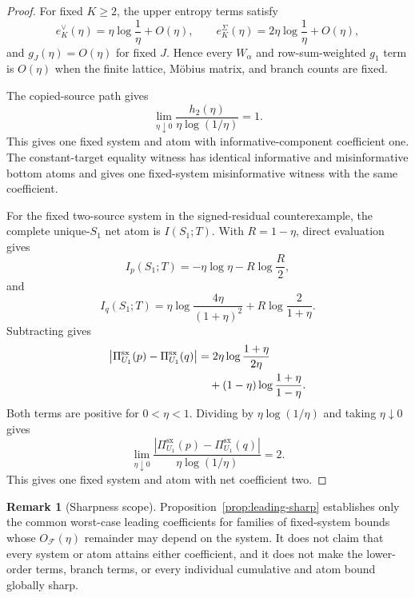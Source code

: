 \documentclass[11pt]{article}
\theoremstyle{definition}
\newtheorem{remark}[theorem]{Remark}
\newcommand{\sx}{\mathrm{sx}}
\begin{document}
\begin{proof}
For fixed \(K\geq2\), the upper entropy terms satisfy
\begin{equation}
  e_K^\vee(\eta)
  =
  \eta\log\frac1\eta+O(\eta),
  \qquad
  e_K^\Sigma(\eta)
  =
  2\eta\log\frac1\eta+O(\eta),
\end{equation}
and \(g_J(\eta)=O(\eta)\) for fixed \(J\).  Hence every \(W_\alpha\) and row-sum-weighted
\(g_1\) term is \(O(\eta)\) when the finite lattice, M{\"o}bius matrix, and branch counts are
fixed.

The copied-source path gives
\begin{equation}
  \lim_{\eta\downarrow0}
  \frac{h_2(\eta)}{\eta\log(1/\eta)}
  =1.
\end{equation}
This gives one fixed system and atom with informative-component coefficient one.  The
constant-target equality witness has identical informative and misinformative bottom atoms and
gives one fixed-system misinformative witness with the same coefficient.

For the fixed two-source system in the signed-residual counterexample, the complete
unique-\(S_1\) net atom is \(I(S_1;T)\).  With \(R=1-\eta\), direct evaluation gives
\begin{equation}
  I_p(S_1;T)
  =
  -\eta\log\eta-R\log\frac{R}{2},
\end{equation}
and
\begin{equation}
  I_q(S_1;T)
  =
  \eta\log\frac{4\eta}{(1+\eta)^2}
  +
  R\log\frac{2}{1+\eta}.
\end{equation}
Subtracting gives
\begin{align}
  \left|
  \Pi_{U_1}^{\sx}(p)-\Pi_{U_1}^{\sx}(q)
  \right|
  &=
  2\eta\log\frac{1+\eta}{2\eta}
  \notag\\
  &\quad+
  (1-\eta)\log\frac{1+\eta}{1-\eta}.
\end{align}
Both terms are positive for \(0<\eta<1\).  Dividing by
\(\eta\log(1/\eta)\) and taking \(\eta\downarrow0\) gives
\begin{equation}
  \lim_{\eta\downarrow0}
  \frac{
    \left|\Pi_{U_1}^{\sx}(p)-\Pi_{U_1}^{\sx}(q)\right|
  }{
    \eta\log(1/\eta)
  }
  =2.
\end{equation}
This gives one fixed system and atom with net coefficient two.
\end{proof}

\begin{remark}[Sharpness scope]
Proposition~\ref{prop:leading-sharp} establishes only the common worst-case leading coefficients
for families of fixed-system bounds whose \(O_{\mathcal F}(\eta)\) remainder may depend on the
system.  It does not claim that every system or atom attains either coefficient, and it does not
make the lower-order terms, branch terms, or every individual cumulative and atom bound globally
sharp.
\end{remark}
\end{document}
